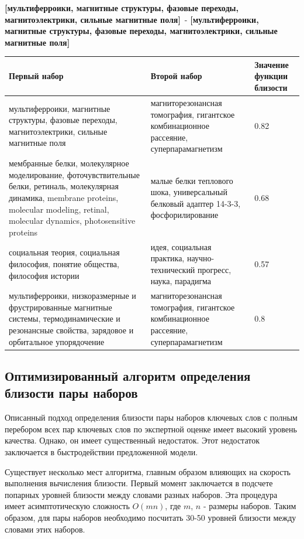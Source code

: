\textbf{[мультиферроики, магнитные структуры, фазовые переходы, магнитоэлектрики, сильные магнитные поля]}\
-
\textbf{[мультиферроики, магнитные структуры, фазовые переходы, магнитоэлектрики, сильные магнитные поля]}\

\begin{tabularx}{16cm}{|X|X|X|}
        \hline
        Первый набор & Второй набор & Значение функции близости \\ \hline
        мультиферроики, магнитные структуры, фазовые переходы, магнитоэлектрики, сильные магнитные поля & магниторезонансная томография, гигантское комбинационное рассеяние, суперпарамагнетизм & 0.82 \\ \hline
        мембранные белки, молекулярное моделирование, фоточувствительные белки, ретиналь, молекулярная динамика, membrane proteins, molecular modeling, retinal, molecular dynamics, photosensitive proteins & малые белки теплового шока, универсальный белковый адаптер 14-3-3, фосфорилирование & 0.68 \\ \hline
        социальная теория, социальная философия, понятие общества, философия истории & идея, социальная практика, научно-технический прогресс, наука, парадигма & 0.57 \\ \hline
        мультиферроики, низкоразмерные и фрустрированные магнитные системы, термодинамические и резонансные свойства, зарядовое и орбитальное упорядочение & магниторезонансная томография, гигантское комбинационное рассеяние, суперпарамагнетизм & 0.8 \\ \hline

\end{tabularx}


\subsection{Оптимизированный алгоритм определения близости пары наборов}

Описанный подход определения близости пары наборов ключевых слов с полным перебором всех пар ключевых слов по экспертной оценке имеет высокий уровень качества. Однако, он имеет существенный недостаток. Этот недостаток заключается в быстродействии предложенной модели. 

Существует несколько мест алгоритма, главным образом влияющих на скорость выполнения вычисления близости. Первый момент заключается в подсчете попарных уровней близости между словами разных наборов. Эта процедура имеет асимптотическую сложность $O(mn)$, где $m$, $n$ - размеры наборов. Таким образом, для пары наборов необходимо посчитать 30-50 уровней близости между словами этих наборов.

